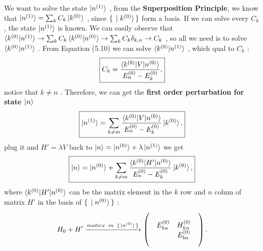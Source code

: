 \documentclass[UTF8,12pt]{article} %
\begin{document}
We want to solve the state $\ket{n^{(1)}}$ , from the {\bf Superposition Principle}, we know that $\ket{n^{(1)}}=\sum_k{C_k \ket{k^{(0)}}}$ , since $\set{\ket{k^{(0)}}}$ form a basis. If we can solve every $C_k$ , the state $\ket{n^{(1)}}$ is known. We can easily observe that $\braket{k^{(0)} | n^{(1)}} \to \sum_k{ C_k \braket{ k^{(0)} | n^{(0)} } } \to \sum_k{ C_k \delta_{k,n} } \to C_k$ , so all we need is to solve $\braket{ k^{(0)} | n^{(1)} }$ . 
\newpage From Equation (5.10) we can solve $\braket{ k^{(0)} | n^{(1)} }$ , which qual to $C_k$ :
\begin{equation}
    \boxed{ C_k = \frac{\braket{k^{(0)}|V|n^{(0)}}}{E^{(0)}_n-E^{(0)}_k} , }
\end{equation}
notice that $k\neq n$ . Therefore, we can get the {\bf first order perturbation for state $\ket{n}$ }
\begin{equation}
    \boxed{ \ket{n^{(1)}} = \sum_{k\neq m} \frac{ \braket{ k^{(0)}|V | n^{(0)} } }{ E^{(0)}_n - E^{(0)}_k } \ket{ k^{(0)}}, }
\end{equation}
plug it and $H'=\lambda V$ back to $ \ket{n} = \ket{n^{(0)}} + \lambda \ket{n^{(1)}} $ we get 
\begin{equation}
    \boxed{ \ket{n} = \ket{n^{(0)}} + \sum_{k\neq m} \frac{ \braket{ k^{(0)}|H'| n^{(0)} } }{ E^{(0)}_n - E^{(0)}_k } \ket{ k^{(0)}} , }
\end{equation}
where $\braket{k^{(0)}|H'|n^{(0)}}$ can be the matrix element in the $k$ row and $n$ colum of matrix $H'$ in the basis of $\set{\ket{n^{(0)}}}$ :
\[ H_0+H' \xrightarrow{matirx \hspace{1ex} in \hspace{1ex} \set{\ket{n^{(0)}}}} 
\begin{pmatrix}
    &  &  &  \\
    & E^{(0)}_{ka} & H^{(0)}_{kn} & \\
    &  & E^{(0)}_{bn} & \\
    &  & & \\
\end{pmatrix} . \] 
\end{document}
